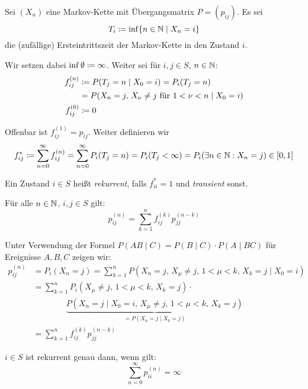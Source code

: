 \documentclass[a4paper,twoside,DIV15,BCOR12mm]{scrbook}
\begin{document}
\pagebreak[2]
Sei $(X_n)$ eine Markov-Kette mit Übergangsmatrix $P=(p_{ij})$. Es sei
\[
T_i \da \inf\{n\in\MdN\mid X_n =i\}
\]
die (zufällige) Ersteintrittszeit der Markov-Kette in den Zustand $i$.

Wir setzen dabei $\inf\emptyset \da \infty$. Weiter sei für $i,j\in S$, $n\in \mathbb{N}$:
\begin{align*}
f_{ij}^{(n)} &\da P(T_j=n\mid X_0=i) = P_i(T_j=n) \\
&=P(X_n=j,\, X_\nu\ne j \text{ für } 1 < \nu < n\mid X_0=i) \\
f_{ij}^{(0)} &\da 0
\end{align*}

Offenbar ist $f_{ij}^{(1)} = p_{ij}$. Weiter definieren wir
\[
f_{ij}^{*} \da \sum_{n=0}^\infty f_{ij}^{(n)} = \sum_{n=0}^\infty P_i(T_j=n) = P_i(T_j<\infty) = P_i(\exists n\in \MdN: X_n=j)\in[0,1]
\]

\begin{definition}
Ein Zustand $i\in S$ heißt \emph{rekurrent}, falls $f_{ii}^{*} = 1$ und \emph{transient} sonst. %
\end{definition}

\begin{lemma}
\label{lem2.2}Für alle $n\in\mathbb{N}$, $i,j\in S$ gilt:
\[
p_{ij}^{(n)} = \sum_{k=1}^n f_{ij}^{(k)} p_{jj}^{(n-k)}
\]
\end{lemma}

\begin{beweis}
Unter Verwendung der Formel $P(AB\mid C) = P(B\mid C)\cdot P(A\mid BC)$ für Ereignisse $A,B,C$ zeigen wir:
\begin{align*}
p_{ij}^{(n)} &= P_i(X_n=j) = \sum_{k=1}^n P({X_n=j},\, {X_\mu\ne j,\, 1<\mu<k,\, X_k = j}\mid {X_0=i}) \\
&= \sum_{k=1}^n P_i(X_\mu\ne j,\, 1<\mu<k,\, X_k = j)\cdot\\
&\quad\quad\quad\quad \underbrace{P(X_n=j\mid X_0=i,\,X_\mu\ne j,\, 1<\mu<k,\, X_k = j)}_{=P(X_n=j\mid  X_k=j)}\\
&=\sum_{k=1}^nf_{ij}^{(k)} p_{jj}^{(n-k)}
\end{align*}
\end{beweis}

\begin{satz}
\label{satz2.3}%
$i\in S$ ist rekurrent genau dann, wenn gilt:
\[
\sum_{n=0}^\infty p_{ii}^{(n)} = \infty
\]
\end{satz}
\end{document}

